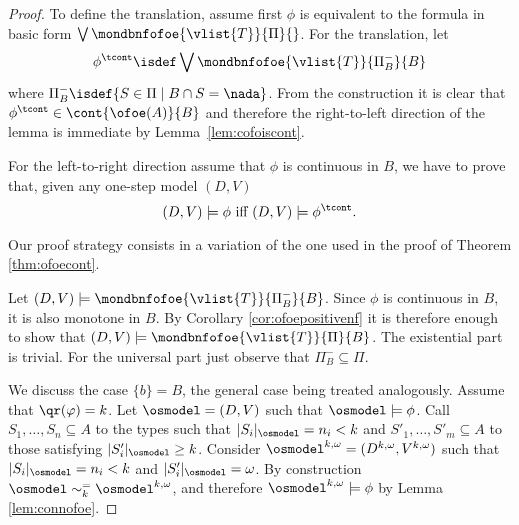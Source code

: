 \begin{proof}
To define the translation, assume first $\phi$ is equivalent to the formula in basic form
$\bigvee \mondbnfofoe{\vlist{T}}{\Pi}{} $.
For the translation, let
\[
\phi^\tcont \isdef 
\bigvee \mondbnfofoe{\vlist{T}}{\Pi^{-}_{B}}{B} 
\]
where $\Pi^{-}_{B} \isdef \{S\in \Pi \mid B \cap S = \nada \}$.
From the construction it is clear that $\phi^\tcont \in \cont{\ofoe(A)}{B}$ and
therefore the right-to-left direction of the lemma is immediate by 
Lemma~\ref{lem:cofoiscont}. 

For the left-to-right direction assume that $\phi$ is continuous in $B$, we have
to prove that, given any  
one-step model $(D, V)$ 
\[(D, V) \models \phi \text{ iff }(D, V) \models \phi^\tcont.\]

Our proof strategy consists in a variation of the one used in the proof of Theorem \ref{thm:ofoecont}.

\bigskip

\noindent \fbox{$\Leftarrow$}
Let $(D, V) \models \mondbnfofoe{\vlist{T}}{\Pi^{-}_{B}}{B}$.
Since $\phi$ is continuous in $B$, it is also monotone in $B$. By Corollary \ref{cor:ofoepositivenf} it is therefore enough to show that $(D, V) \models \mondbnfofoe{\vlist{T}}{\Pi}{B}$. The 
existential part is trivial. For the universal part just observe that 
$\Pi^{-}_{B} \subseteq \Pi$.

\bigskip
\noindent \fbox{$\Rightarrow$}
We discuss the case $\{b\}=B$, the general case being treated analogously.
Assume that $\qr(\varphi)=k$.
Let $\osmodel=(D,V)$ such that $\osmodel \models \phi$.  Call $S_1,\dots,S_n \subseteq A$ to the types such that $|S_i|_\osmodel = n_i< k$
and $S'_1,\dots,S'_m \subseteq A$ to those satisfying $|S'_i|_\osmodel \geq k$. Consider $\osmodel^{k, \omega}=(D^{k, \omega}, V^{k, \omega})$ such that $|S_i|_\osmodel = n_i< k$
and  $|S'_i|_\osmodel = \omega$. By construction  $\osmodel \sim^=_k \osmodel^{k, \omega}$, and therefore $\osmodel^{k, \omega} \models \phi$  by Lemma \ref{lem:connofoe}.


\end{proof}
